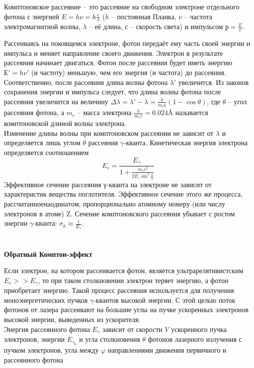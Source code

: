 \documentclass[__main__.tex]{subfiles}
\begin{document}
\begin{definition}
	Комптоновское рассеяние – это рассеяние на свободном электроне отдельного фотона с энергией $E = h\nu = h\frac{c}{\lambda}$ ($h$ – постоянная Планка, $ν$ – частота электромагнитной волны, $λ$ – её длина, $с$ – скорость света) и импульсом $р = \frac{E}{c}$.
\end{definition}

Рассеиваясь на покоящемся электроне, фотон передаёт ему часть своей энергии и импульса и меняет направление своего движения. Электрон в результате рассеяния начинает двигаться. Фотон после рассеяния будет иметь энергию $Е' = hν'$ (и частоту) меньшую, чем его энергия (и частота) до рассеяния. Соответственно, после рассеяния длина волны фотона $λ'$ увеличится. Из законов сохранения энергии и импульса следует, что длина волны фотона после рассеяния увеличится на величину $\Delta \lambda = \lambda' - \lambda = \frac{h}{m_e с}(1-\cos\theta)$, где $θ$ – угол рассеяния фотона, а $m_e$ – масса электрона $\frac{h}{m_e c} = 0.024 Å$ называется комптоновской длиной волны электрона.\\

Изменение длины волны при комптоновском рассеянии не зависит от $λ$ и определяется лишь углом $θ$ рассеяния $γ$-кванта. Кинетическая энергия электрона определяется соотношением
$$E_e = \frac{E_γ}{1+\frac{m_e c^2}{2E_γ \sin^2\frac{\theta}{2}}}$$
Эффективное сечение рассеяния γ-кванта на электроне не зависит от характеристик вещества поглотителя. Эффективное сечение этого же процесса,$ рассчитанное на один атом$, пропорционально атомному номеру (или числу электронов в атоме) Z.
Сечение комптоновского рассеяния убывает с ростом энергии $γ$-кванта: $\sigma_k \approx \frac{1}{E_γ}$.
\\\\\\
\textbf{Обратный Комптон-эффект}

Если электрон, на котором рассеивается фотон, является ультрарелятивистским $E_e >> E_γ$, то при таком столкновении электрон теряет энергию, а фотон приобретает энергию. Такой процесс рассеяния используется для получения моноэнергетических пучков $γ$-квантов высокой энергии. С этой целью поток фотонов от лазера рассеивают на большие углы на пучке ускоренных электронов высокой энергии, выведенных из ускорителя.\\

Энергия рассеянного фотона $E_γ$ зависит от скорости $V$ ускоренного пучка электронов, энергии $E_{γ_0}$ и угла столкновения $θ$ фотонов лазерного излучения с пучком электронов, угла между $φ$ направлениями движения первичного и рассеянного фотона
\end{document}
